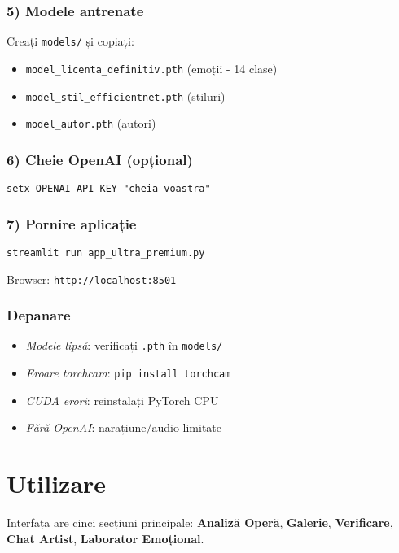 \subsubsection{5) Modele antrenate}
Creați \texttt{models/} și copiați:
\begin{itemize}[noitemsep,topsep=2pt]
  \item \texttt{model\_licenta\_definitiv.pth} (emoții - 14 clase)
  \item \texttt{model\_stil\_efficientnet.pth} (stiluri)
  \item \texttt{model\_autor.pth} (autori)
\end{itemize}

\subsubsection{6) Cheie OpenAI (opțional)}
\begin{verbatim}
setx OPENAI_API_KEY "cheia_voastra"
\end{verbatim}

\subsubsection{7) Pornire aplicație}
\begin{verbatim}
streamlit run app_ultra_premium.py
\end{verbatim}
Browser: \texttt{http://localhost:8501}

\subsubsection{Depanare}
\begin{itemize}[noitemsep,topsep=2pt]
  \item \emph{Modele lipsă}: verificați \texttt{.pth} în \texttt{models/}
  \item \emph{Eroare torchcam}: \texttt{pip install torchcam}
  \item \emph{CUDA erori}: reinstalați PyTorch CPU
  \item \emph{Fără OpenAI}: narațiune/audio limitate
\end{itemize}

\section{Utilizare}
Interfața are cinci secțiuni principale: \textbf{Analiză Operă}, \textbf{Galerie}, \textbf{Verificare}, \textbf{Chat Artist}, \textbf{Laborator Emoțional}.

